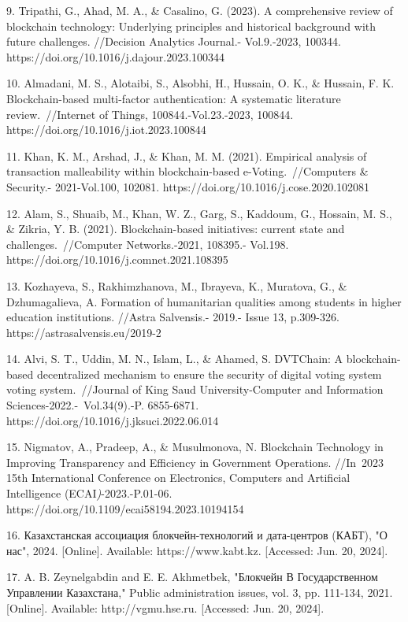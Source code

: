 9. Tripathi, G., Ahad, M. A., \& Casalino, G. (2023). A comprehensive
review of blockchain technology: Underlying principles and historical
background with future challenges. //Decision Analytics Journal.-
Vol.9.-2023, 100344. https://doi.org/10.1016/j.dajour.2023.100344

10. Almadani, M. S., Alotaibi, S., Alsobhi, H., Hussain, O. K., \&
Hussain, F. K. Blockchain-based multi-factor authentication: A
systematic literature review.~//Internet of Things,
100844.-Vol.23.-2023, 100844. https://doi.org/10.1016/j.iot.2023.100844

11. Khan, K. M., Arshad, J., \& Khan, M. M. (2021). Empirical analysis
of transaction malleability within blockchain-based
e-Voting.~//Computers \& Security.- 2021-Vol.100, 102081.
https://doi.org/10.1016/j.cose.2020.102081

12. Alam, S., Shuaib, M., Khan, W. Z., Garg, S., Kaddoum, G., Hossain,
M. S., \& Zikria, Y. B. (2021). Blockchain-based initiatives: current
state and challenges.~//Computer Networks.-2021, 108395.- Vol.198.
https://doi.org/10.1016/j.comnet.2021.108395

13. Kozhayeva, S., Rakhimzhanova, M., Ibrayeva, K., Muratova, G., \&
Dzhumagalieva, A. Formation of humanitarian qualities among students in
higher education institutions. //Astra Salvensis.- 2019.- Issue 13,
p.309-326. https://astrasalvensis.eu/2019-2

14. Alvi, S. T., Uddin, M. N., Islam, L., \& Ahamed, S. DVTChain: A
blockchain-based decentralized mechanism to ensure the security of
digital voting system voting system.~//Journal of King Saud
University-Computer and Information Sciences-2022.-~Vol.34(9).-P.
6855-6871. https://doi.org/10.1016/j.jksuci.2022.06.014

15. Nigmatov, A., Pradeep, A., \& Musulmonova, N. Blockchain Technology
in Improving Transparency and Efficiency in Government Operations.
//In~2023 15th International Conference on Electronics, Computers and
Artificial Intelligence (ECAI\emph{)}-2023.-P.01-06.
https://doi.org/10.1109/ecai58194.2023.10194154

16. Казахстанская ассоциация блокчейн-технологий и дата-центров (КАБТ),
"О нас", 2024. {[}Online{]}. Available: https://www.kabt.kz.
{[}Accessed: Jun. 20, 2024{]}.

17. A. B. Zeynelgabdin and E. E. Akhmetbek, "Блокчейн В Государственном
Управлении Казахстана," Public administration issues, vol. 3, pp.
111-134, 2021. {[}Online{]}. Available: http://vgmu.hse.ru. {[}Accessed:
Jun. 20, 2024{]}.

